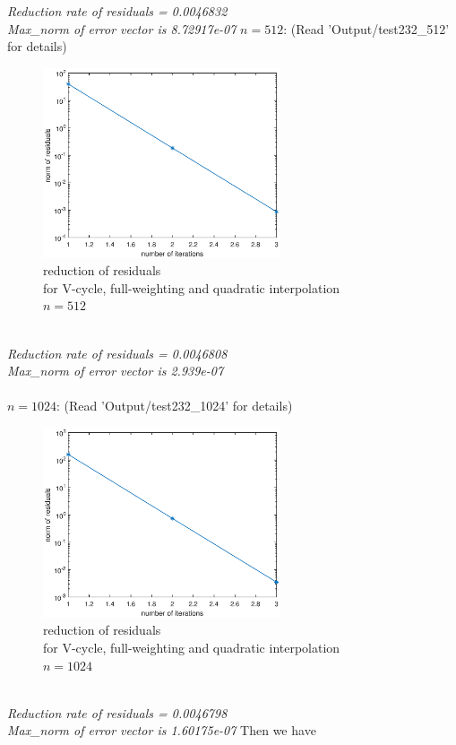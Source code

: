 \documentclass[a4paper,twocolumn]{article}
\theoremstyle{definition}
\begin{document}
\emph{Reduction rate of residuals = 0.0046832}\\
\emph{Max\_norm of error vector is 8.72917e-07}
\newpage
\noindent $n=512$: (Read 'Output/test232\_512' for details)
\begin{figure}[!htp]   
	\centering
	\includegraphics[width=7cm]{Pictures/F232_3.eps}
	\caption{reduction of residuals \\for V-cycle, full-weighting and quadratic interpolation\\ $n = 512$}
\end{figure}\\
\emph{Reduction rate of residuals = 0.0046808}\\
\emph{Max\_norm of error vector is 2.939e-07}\\\\
$n=1024$: (Read 'Output/test232\_1024' for details)
\begin{figure}[!htp]   
	\centering
	\includegraphics[width=7cm]{Pictures/F232_4.eps}
	\caption{reduction of residuals \\for V-cycle, full-weighting and quadratic interpolation\\ $n = 1024$}
\end{figure}\\
\emph{Reduction rate of residuals = 0.0046798}\\
\emph{Max\_norm of error vector is 1.60175e-07}
\newpage
\noindent Then we have
\end{document}
